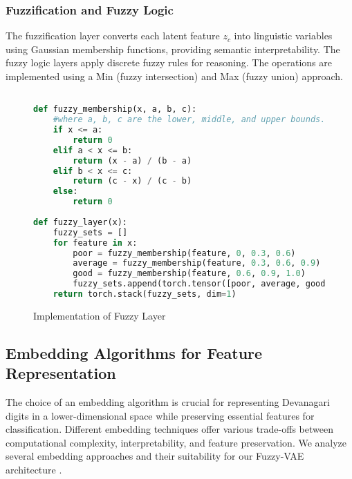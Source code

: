 \documentclass[9pt,a4paper,twoside]{rho-class/rho}
\begin{document}
    \subsubsection{Fuzzification and Fuzzy Logic}
    The fuzzification layer converts each latent feature \( z_c \) into linguistic variables using Gaussian membership functions, providing semantic interpretability. The fuzzy logic layers apply discrete fuzzy rules for reasoning. The operations are implemented using a Min (fuzzy intersection) and Max (fuzzy union) approach.

     \begin{figure}[h!]
    \centering
    \begin{lstlisting}[language=Python]

def fuzzy_membership(x, a, b, c):
    #where a, b, c are the lower, middle, and upper bounds.
    if x <= a:
        return 0
    elif a < x <= b:
        return (x - a) / (b - a)
    elif b < x <= c:
        return (c - x) / (c - b)
    else:
        return 0
        
def fuzzy_layer(x):
    fuzzy_sets = []
    for feature in x:
        poor = fuzzy_membership(feature, 0, 0.3, 0.6)
        average = fuzzy_membership(feature, 0.3, 0.6, 0.9)
        good = fuzzy_membership(feature, 0.6, 0.9, 1.0)
        fuzzy_sets.append(torch.tensor([poor, average, good], device=device))
    return torch.stack(fuzzy_sets, dim=1)
 \end{lstlisting}
        \caption{Implementation of Fuzzy Layer}
        \label{Code 3.}
    \end{figure}
    

\subsection{Embedding Algorithms for Feature Representation}

The choice of an embedding algorithm is crucial for representing Devanagari digits in a lower-dimensional space while preserving essential features for classification. Different embedding techniques offer various trade-offs between computational complexity, interpretability, and feature preservation. We analyze several embedding approaches and their suitability for our Fuzzy-VAE architecture \cite{kingma}.
\end{document}
